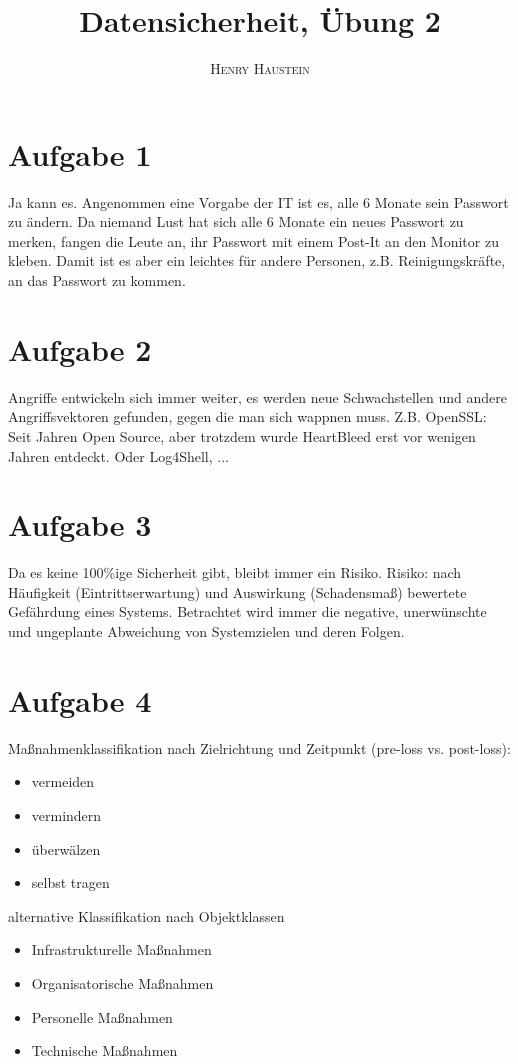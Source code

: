 \documentclass{article}
\title{\textbf{Datensicherheit, Übung 2}}
\author{\textsc{Henry Haustein}}
\date{}
\begin{document}
	\maketitle
	
	\section*{Aufgabe 1}
	Ja kann es. Angenommen eine Vorgabe der IT ist es, alle 6 Monate sein Passwort zu ändern. Da niemand Lust hat sich alle 6 Monate ein neues Passwort zu merken, fangen die Leute an, ihr Passwort mit einem Post-It an den Monitor zu kleben. Damit ist es aber ein leichtes für andere Personen, z.B. Reinigungskräfte, an das Passwort zu kommen.

	\section*{Aufgabe 2}
	Angriffe entwickeln sich immer weiter, es werden neue Schwachstellen und andere Angriffsvektoren gefunden, gegen die man sich wappnen muss. Z.B. OpenSSL: Seit Jahren Open Source, aber trotzdem wurde HeartBleed erst vor wenigen Jahren entdeckt. Oder Log4Shell, ...
	
	\section*{Aufgabe 3}
	Da es keine 100\%ige Sicherheit gibt, bleibt immer ein Risiko. Risiko: nach Häufigkeit (Eintrittserwartung) und Auswirkung (Schadensmaß) bewertete Gefährdung eines Systems. Betrachtet wird immer die negative, unerwünschte und ungeplante Abweichung von Systemzielen und deren Folgen.
	
	\section*{Aufgabe 4}
	Maßnahmenklassifikation nach Zielrichtung und Zeitpunkt (pre-loss vs. post-loss):
	\begin{itemize}
		\item vermeiden
		\item vermindern
		\item überwälzen
		\item selbst tragen
	\end{itemize}

	alternative Klassifikation nach Objektklassen
	\begin{itemize}
		\item Infrastrukturelle Maßnahmen
		\item Organisatorische Maßnahmen
		\item Personelle Maßnahmen
		\item Technische Maßnahmen
	\end{itemize}
	
\end{document}
